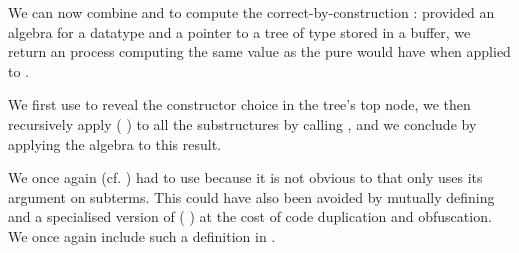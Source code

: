 We can now combine  and  to compute
the correct-by-construction : provided an algebra for
a datatype  and a pointer to a tree 
of type  stored in a buffer, we return an 
process computing the same value as the pure  would
have when applied to .


We first use  to reveal the constructor choice in the
tree's top node, we then recursively apply ( )
to all the substructures by calling , and we conclude by
applying the algebra to this result.


We once again (cf. ) had to
use \assertTotal{} because it is not obvious to
\idris{} that  only uses its argument on subterms.
%
This could have also been avoided by mutually defining 
and a specialised version of
( \IdrisKeyword{(} \IdrisKeyword{)})
at the cost of code duplication and obfuscation.
%
We once again include such a definition in .
